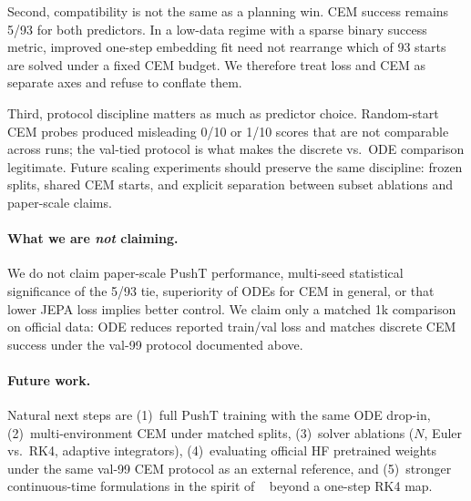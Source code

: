 Second, compatibility is not the same as a planning win.
CEM success remains 5/93 for both predictors.
In a low-data regime with a sparse binary success metric, improved
one-step embedding fit need not rearrange which of 93 starts are
solved under a fixed CEM budget.
We therefore treat loss and CEM as separate axes and refuse to conflate
them.

Third, protocol discipline matters as much as predictor choice.
Random-start CEM probes produced misleading 0/10 or 1/10 scores that
are not comparable across runs; the val-tied protocol is what makes
the discrete vs.\ ODE comparison legitimate.
Future scaling experiments should preserve the same discipline:
frozen splits, shared CEM starts, and explicit separation between
subset ablations and paper-scale claims.

\paragraph{What we are \emph{not} claiming.}
We do not claim paper-scale PushT performance, multi-seed statistical
significance of the 5/93 tie, superiority of ODEs for CEM in general,
or that lower JEPA loss implies better control.
We claim only a matched 1k comparison on official data: ODE reduces
reported train/val loss and matches discrete CEM success under the
val-99 protocol documented above.

\paragraph{Future work.}
Natural next steps are (1)~full PushT training with the same ODE
drop-in, (2)~multi-environment CEM under matched splits,
(3)~solver ablations ($N$, Euler vs.\ RK4, adaptive integrators),
(4)~evaluating official HF pretrained weights under the same val-99
CEM protocol as an external reference, and
(5)~stronger continuous-time formulations in the spirit of
\PriorODEWorld{}~\cite{liu2026odeworld} beyond a one-step RK4 map.
